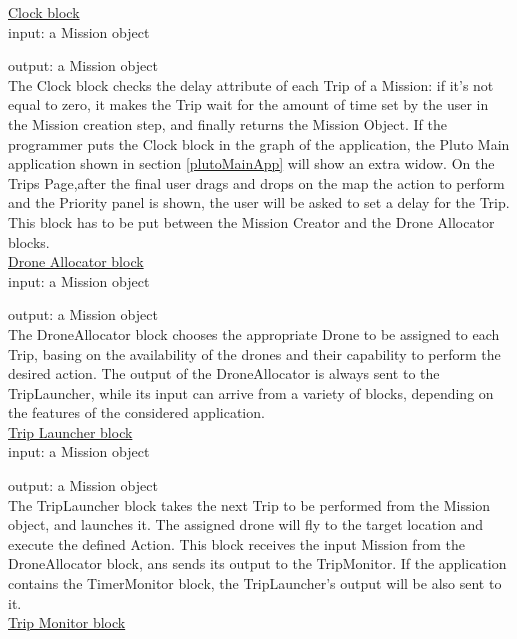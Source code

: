 \underline{Clock block}
\\

input: a Mission object

output: a Mission object
\\

The Clock block checks the delay attribute of each Trip of a Mission: if it's not equal to zero, it makes the Trip wait for the amount of time set by the user in the Mission creation step, and finally returns the Mission Object.
If the programmer puts the Clock block in the graph of the application, the Pluto Main application shown in section \ref{plutoMainApp} will show an extra widow.
On the Trips Page,after the final user drags and drops on the map the action to perform and the Priority panel is shown, the user will be asked to set a delay for the Trip.
This block has to be put between the Mission Creator and the Drone Allocator blocks.
\\

\underline{Drone Allocator block}
\\

input: a Mission object

output: a Mission object
\\

The DroneAllocator block chooses the appropriate Drone to be assigned to each Trip, basing on the availability of the drones and their capability to perform the desired action.
The output of the DroneAllocator is always sent to the TripLauncher, while its input can arrive from a variety of blocks, depending on the features of the considered application.
\\

\underline{Trip Launcher block}
\\

input: a Mission object

output: a Mission object
\\

The TripLauncher block takes the next Trip to be performed from the Mission object, and launches it.
The assigned drone will fly to the target location and execute the defined Action.
This block receives the input Mission from the DroneAllocator block, ans sends its output to the TripMonitor.
If the application contains the TimerMonitor block, the TripLauncher's output will be also sent to it.
\\

\underline{Trip Monitor block}
\\

